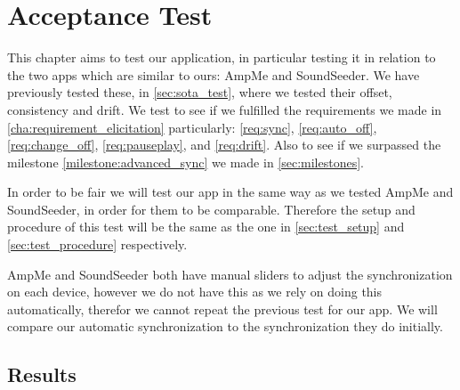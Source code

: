 \chapter{Acceptance Test}\label{cha:acctest}
This chapter aims to test our application, in particular testing it in relation to the two apps which are similar to ours: AmpMe and SoundSeeder.
We have previously tested these, in \vref{sec:sota_test}, where we tested their offset, consistency and drift.
We test to see if we fulfilled the requirements we made in \vref{cha:requirement_elicitation} particularly: \ref{req:sync}, \ref{req:auto_off}, \ref{req:change_off}, \ref{req:pauseplay}, and \ref{req:drift}.
Also to see if we surpassed the milestone \ref{milestone:advanced_sync} we made in \vref{sec:milestones}.

In order to be fair we will test our app in the same way as we tested AmpMe and SoundSeeder, in order for them to be comparable.
Therefore the setup and procedure of this test will be the same as the one in \vref{sec:test_setup} and \vref{sec:test_procedure} respectively.

AmpMe and SoundSeeder both have manual sliders to adjust the synchronization on each device, however we do not have this as we rely on doing this automatically, therefor we cannot repeat the previous test for our app.
We will compare our automatic synchronization to the synchronization they do initially.

\section{Results}




